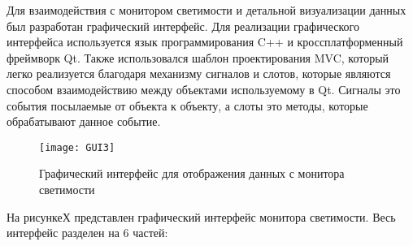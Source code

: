   Для взаимодействия с монитором светимости и детальной визуализации данных был разработан графический интерфейс. Для реализации графического интерфейса используется язык программирования C++ и кроссплатформенный фреймворк Qt. Также использовался шаблон проектирования MVC, который легко реализуется благодаря механизму сигналов и слотов, которые являются способом взаимодействию между объектами используемому в Qt. Сигналы это события посылаемые от объекта к объекту, а слоты это методы, которые обрабатывают данное событие.\par
\begin{figure}[htp]
  \centering
  \texttt{[image: GUI3]}
  \caption{Графический интерфейс для отображения данных с монитора светимости}
  \label{fig:galaxy}
\end{figure}
  На рисункеХ представлен графический интерфейс монитора светимости. Весь интерфейс разделен на 6 частей:
